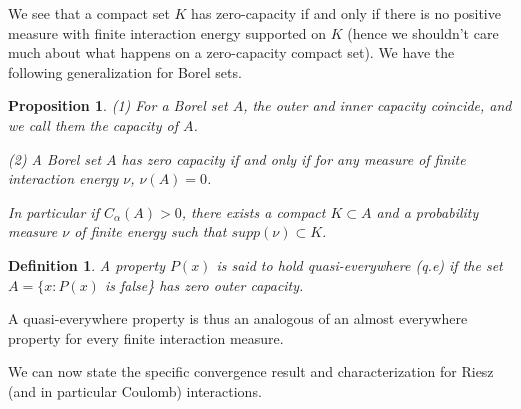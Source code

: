\documentclass[a4paper,12pt]{report}
\newtheorem*{prop}{Proposition}
\newtheorem*{deft}{Definition}
\begin{document}
We see that a compact set $K$ has zero-capacity if and only if there is no positive measure with finite interaction energy supported on $K$ (hence we shouldn't care much about what happens on a zero-capacity compact set).  We have the following generalization for Borel sets.

\begin{prop}

(1) For a Borel set $A$, the outer and inner capacity coincide, and we call them the capacity of $A$.

(2) A Borel set $A$ has zero capacity if and only if for any measure of finite interaction energy $\nu$, $\nu(A) = 0$.

In particular if $C_{\alpha}(A) > 0$, there exists a compact $K \subset A$ and a probability measure $\nu$ of finite energy such that $supp(\nu) \subset K$.
\end{prop}

\begin{deft}

A property $P(x)$ is said to hold quasi-everywhere (q.e) if the set $A = \{x : P(x)$ is false\} has zero outer capacity.
\end{deft}

A quasi-everywhere property is thus an analogous of an almost everywhere property for every finite interaction measure.
\vspace{0.5cm}

We can now state the specific convergence result and characterization for Riesz (and in particular Coulomb) interactions.
\end{document}
